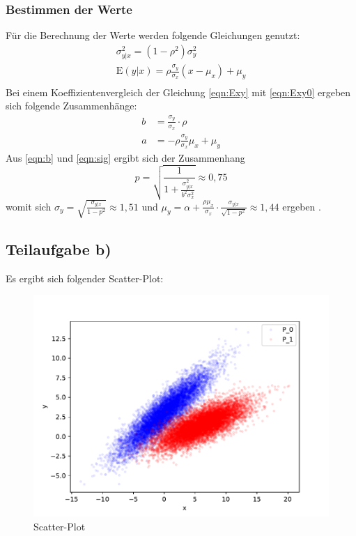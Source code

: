 \subsubsection{Bestimmen der Werte}
Für die Berechnung der Werte werden folgende Gleichungen genutzt:
\begin{align}
  \sigma_{y\lvert x}^2 = (1-\rho^2)\sigma_y^2 \label{eqn:sig}\\
  \text{E}(y\lvert x) = \rho \frac{\sigma_y}{\sigma_x} (x-\mu_x) + \mu_y \label{eqn:Exy} \\
\end{align}
Bei einem Koeffizientenvergleich der Gleichung \eqref{eqn:Exy} mit \eqref{eqn:Exy0} ergeben sich folgende Zusammenhänge:
\begin{align}
  b  &= \frac{\sigma_y}{\sigma_x} \cdot \rho \label{eqn:b} \\
a &= - \rho \frac{\sigma_y}{\sigma_x} \mu_x + \mu_y
\end{align}
Aus \eqref{eqn:b} und \eqref{eqn:sig} ergibt sich der Zusammenhang
\begin{equation}
  p=\sqrt{\frac{1}{1+\frac{\sigma^2_{y\lvert x}}{b^2 \sigma^2_x}}} \approx 0,75
\end{equation}
womit sich $\sigma_y=\sqrt{\frac{\sigma_{y\lvert x}}{1-p^2}} \approx 1,51$ und $\mu_y=\alpha+\frac{\rho \mu_x}{\sigma_x} \cdot \frac{\sigma_{y\lvert x}}{\sqrt{1-p^2}} \approx 1,44 $ ergeben .


\subsection{Teilaufgabe b)}
Es ergibt sich folgender Scatter-Plot:
\begin{figure}[H]
  \includegraphics{Aufgabe10/Populationen.pdf}
  \caption{Scatter-Plot}
  \label{}
\end{figure}


